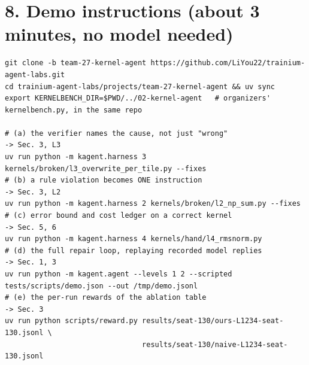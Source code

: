 \documentclass[11pt]{article}
\begin{document}
\section*{8. Demo instructions (about 3 minutes, no model needed)}
{\footnotesize
\begin{verbatim}
git clone -b team-27-kernel-agent https://github.com/LiYou22/trainium-agent-labs.git
cd trainium-agent-labs/projects/team-27-kernel-agent && uv sync
export KERNELBENCH_DIR=$PWD/../02-kernel-agent   # organizers' kernelbench.py, in the same repo

# (a) the verifier names the cause, not just "wrong"                          -> Sec. 3, L3
uv run python -m kagent.harness 3 kernels/broken/l3_overwrite_per_tile.py --fixes
# (b) a rule violation becomes ONE instruction                                -> Sec. 3, L2
uv run python -m kagent.harness 2 kernels/broken/l2_np_sum.py --fixes
# (c) error bound and cost ledger on a correct kernel                         -> Sec. 5, 6
uv run python -m kagent.harness 4 kernels/hand/l4_rmsnorm.py
# (d) the full repair loop, replaying recorded model replies                  -> Sec. 1, 3
uv run python -m kagent.agent --levels 1 2 --scripted tests/scripts/demo.json --out /tmp/demo.jsonl
# (e) the per-run rewards of the ablation table                               -> Sec. 3
uv run python scripts/reward.py results/seat-130/ours-L1234-seat-130.jsonl \
                                results/seat-130/naive-L1234-seat-130.jsonl
\end{verbatim}
}
\end{document}
